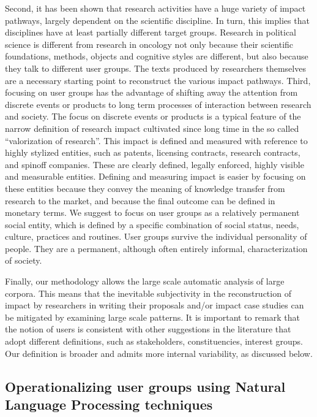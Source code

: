 \documentclass[b5paper,]{book}
\theoremstyle{definition}
\theoremstyle{definition}
\theoremstyle{definition}
\theoremstyle{remark}
\begin{document}
Second, it has been shown that research activities have a huge variety
of impact pathways, largely dependent on the scientific discipline. In
turn, this implies that disciplines have at least partially different
target groups. Research in political science is different from research
in oncology not only because their scientific foundations, methods,
objects and cognitive styles are different, but also because they talk
to different user groups. The texts produced by researchers themselves
are a necessary starting point to reconstruct the various impact
pathways. Third, focusing on user groups has the advantage of shifting
away the attention from discrete events or products to long term
processes of interaction between research and society. The focus on
discrete events or products is a typical feature of the narrow
definition of research impact cultivated since long time in the so
called ``valorization of research''. This impact is defined and measured
with reference to highly stylized entities, such as patents, licensing
contracts, research contracts, and spinoff companies. These are clearly
defined, legally enforced, highly visible and measurable entities.
Defining and measuring impact is easier by focusing on these entities
because they convey the meaning of knowledge transfer from research to
the market, and because the final outcome can be defined in monetary
terms. We suggest to focus on user groups as a relatively permanent
social entity, which is defined by a specific combination of social
status, needs, culture, practices and routines. User groups survive the
individual personality of people. They are a permanent, although often
entirely informal, characterization of society.

Finally, our methodology allows the large scale automatic analysis of
large corpora. This means that the inevitable subjectivity in the
reconstruction of impact by researchers in writing their proposals
and/or impact case studies can be mitigated by examining large scale
patterns. It is important to remark that the notion of users is
consistent with other suggestions in the literature that adopt different
definitions, such as stakeholders, constituencies, interest groups. Our
definition is broader and admits more internal variability, as discussed
below.

\subsection{Operationalizing user groups using Natural Language
Processing
techniques}\label{operationalizing-user-groups-using-natural-language-processing-techniques}
\end{document}
